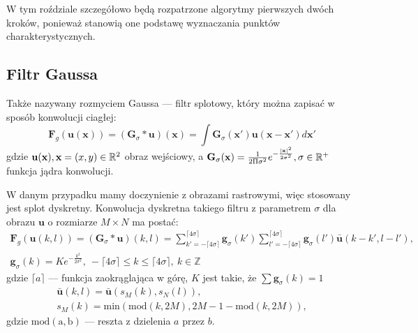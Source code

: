 W tym roździale szczegółowo będą rozpatrzone algorytmy pierwszych dwóch kroków, ponieważ stanowią one podstawę wyznaczania punktów charakterystycznych.

\subsection{Filtr Gaussa}

   Także nazywany rozmyciem Gaussa --- filtr splotowy, który można zapisać w sposób konwolucji ciagłej:
   \begin{equation} \label{eq:gauss_c}
      \mathbf{F}_{g}(\mathbf{u}(\mathbf{x}))
      = (\mathbf{G}_{\sigma} * \mathbf{u}) (\mathbf{x})
      = \int \mathbf{G}_{\sigma}(\mathbf{x}') \mathbf{u}(\mathbf{x}-\mathbf{x}') d\mathbf{x}'
   \end{equation}
   gdzie $ \mathbf{u}(\mathbf{x}) , \smallskip \mathbf{x} = (x, y) \in \mathbb{R}^2 $ obraz wejściowy,
   a $ \mathbf{G}_{\sigma}(\mathbf{x}) = \frac{1}{2 \Pi \sigma^2} e^{-\frac{ | \mathbf{x} |^2}{2\sigma^2} },
   \smallskip \sigma \in \mathbb{R}^+ $ funkcja jądra konwolucji.

   W danym przypadku mamy doczynienie z obrazami rastrowymi, więc stosowany jest splot dyskretny. Konwolucja dyskretna takiego filtru z parametrem $\sigma$ dla obrazu $\mathbf{u}$ o rozmiarze $ M \times N $ ma postać:
   \begin{equation} \label{eq:gauss_d}
      \begin{split}
         \mathbf{F}_{g}(\mathbf{u}(k,l) )
         = (\mathbf{G}_{\sigma} * \mathbf{u}) (k,l) =
         \sum_{k' = -\lceil 4\sigma \rceil}^{\lceil 4\sigma \rceil} \mathbf{g}_{\sigma} (k')
         \sum_{l' = -\lceil 4\sigma \rceil}^{\lceil 4\sigma \rceil} \mathbf{g}_{\sigma} (l') \mathbf{\bar{u}} (k - k', l - l'),
         \\
         \mathbf{g}_{\sigma}(k) = Ke^{- \frac{k^2}{2 \sigma^2}}, \:
         -\lceil 4\sigma \rceil \leq k \leq \lceil 4\sigma \rceil, \:
         k \in \mathbb{Z}
      \end{split}
   \end{equation}
   gdzie $\lceil a \rceil$ --- funkcja zaokrąglająca w górę, $K$ jest takie, że $\sum \mathbf{g}_{\sigma} (k) = 1 $
   \begin{equation}
      \begin{split}
         \mathbf{\bar{u}}(k, l) =  \mathbf{\bar{u}} (s_M(k), s_N(l)),
         \\
         s_M(k) = \mathrm{min}(\mathrm{mod}(k, 2M), 2M - 1 - \mathrm{mod}(k, 2M)),
      \end{split}
   \end{equation}
   gdzie $ \mathrm{mod(a,b)} $ --- reszta z dzielenia $a$ przez $b$.


